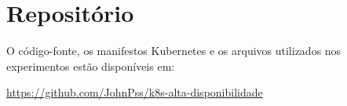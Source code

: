 \FloatBarrier\section{Repositório}\label{sec:repo}
O código-fonte, os manifestos Kubernetes e os
arquivos utilizados nos experimentos estão
disponíveis em:

\url{https://github.com/JohnPss/k8s-alta-disponibilidade}

